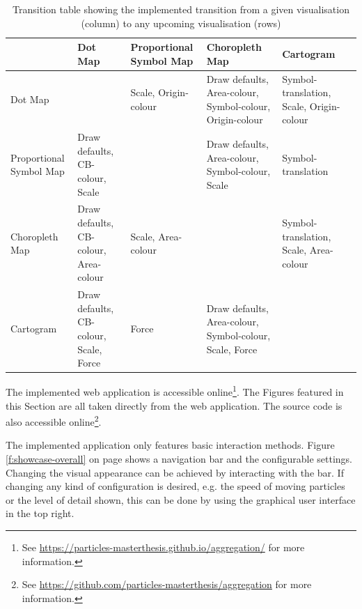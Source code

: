 \begin{table}[!htp]
    \begin{tabular}{M{27mm}|| M{27mm} | M{27mm} | M{27mm} | M{27mm} N}

    ~ & Dot Map & Proportional Symbol Map & Choropleth Map & Cartogram &\\[4ex] \hline \hline

    Dot Map & ~ & Scale, Origin-colour & Draw defaults, Area-colour, Symbol-colour, Origin-colour & Symbol-translation, Scale, Origin-colour &\\[4ex] \hline

    Proportional Symbol Map & Draw defaults, CB-colour, Scale & ~ & Draw defaults, Area-colour, Symbol-colour, Scale & Symbol-translation &\\[4ex] \hline

    Choropleth Map & Draw defaults, CB-colour, Area-colour & Scale, Area-colour & ~ & Symbol-translation, Scale, Area-colour &\\[4ex] \hline

    Cartogram & Draw defaults, CB-colour, Scale, Force & Force & Draw defaults, Area-colour, Symbol-colour, Scale, Force & ~ &\\[4ex]

    \end{tabular}
    \caption{Transition table showing the implemented transition from a given visualisation (column) to any upcoming visualisation (rows)}
    \label{tab:transition-table-implemented}
\end{table}

The implemented web application is accessible online\footnote{See \href{https://particles-masterthesis.github.io/aggregation/}{https://particles-masterthesis.github.io/aggregation/} for more information.}. The Figures featured in this Section are all taken directly from the web application. The source code is also accessible online\footnote{See \href{https://github.com/particles-masterthesis/aggregation}{https://github.com/particles-masterthesis/aggregation} for more information.}.

The implemented application only features basic interaction methods. Figure \ref{f:showcase-overall} on page \pageref{f:showcase-overall} shows a navigation bar and the configurable settings. Changing the visual appearance can be achieved by interacting with the bar. If changing any kind of configuration is desired, e.g. the speed of moving particles or the level of detail shown, this can be done by using the graphical user interface in the top right.

